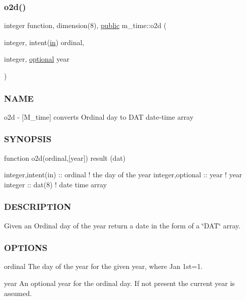 \begin{DoxyVerb}
\subsubsection{\texorpdfstring{o2d()}{o2d()}}
{\footnotesize\ttfamily integer function, dimension(8), \hyperlink{M__stopwatch_83_8txt_a2f74811300c361e53b430611a7d1769f}{public} m\+\_\+time\+::o2d (\begin{DoxyParamCaption}\item[{integer, intent(\hyperlink{M__journal_83_8txt_afce72651d1eed785a2132bee863b2f38}{in})}]{ordinal,  }\item[{integer, \hyperlink{option__stopwatch_83_8txt_aa4ece75e7acf58a4843f70fe18c3ade5}{optional}}]{year }\end{DoxyParamCaption})}



\subsubsection*{N\+A\+ME}

o2d -\/ \mbox{[}M\+\_\+time\mbox{]} converts Ordinal day to D\+AT date-\/time array 

\subsubsection*{S\+Y\+N\+O\+P\+S\+IS}

\begin{DoxyVerb}function o2d(ordinal,[year]) result (dat)

 integer,intent(in) :: ordinal  ! the day of the year
 integer,optional   :: year     ! year
 integer            :: dat(8)   ! date time array
\end{DoxyVerb}


\subsubsection*{D\+E\+S\+C\+R\+I\+P\+T\+I\+ON}

Given an Ordinal day of the year return a date in the form of a \char`\"{}\+D\+A\+T\char`\"{} array.

\subsubsection*{O\+P\+T\+I\+O\+NS}

ordinal The day of the year for the given year, where Jan 1st=1.

year An optional year for the ordinal day. If not present the current year is assumed.


\end{DoxyVerb}

